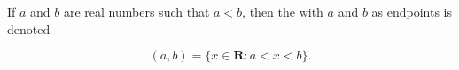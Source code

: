 If $a$ and $b$ are real numbers such that $a < b$, then the  with $a$ and $b$ as endpoints is denoted

$$(a, b) = \{x \in \mathbf{R} : a < x < b\}.$$
